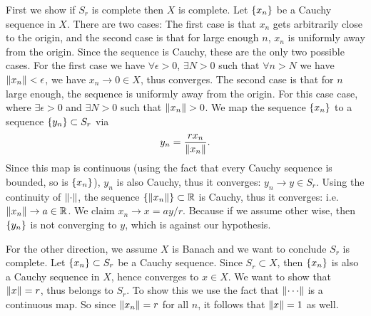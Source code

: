 \begin{solution}
	First we show if $ S_r $ is complete then $ X $ is complete. Let $ \{x_n\} $ be a Cauchy sequence in $ X $. There are two cases: The first case is that $ x_n $ gets arbitrarily close to the origin, and the second case is that for large enough $ n $, $ x_n $ is uniformly away from the origin. Since the sequence is Cauchy, these are the only two possible cases. For the first case we have $ \forall \epsilon>0 $, $ \exists N > 0 $ such that $ \forall n>N $ we have $ \norm{x_n}<\epsilon $, we have $ x_n\to 0 \in X $, thus converges. The second case is that for $ n $ large enough, the sequence is uniformly away from the origin. For this case case, where $ \exists\epsilon>0 $ and $ \exists N>0 $ such that $ \norm{x_n}>0 $. We map the sequence $ \{x_n\} $ to a sequence $ \{y_n\} \subset S_r $ via
	\[ y_n = \frac{rx_n}{\norm{x_n}}. \]
	Since this map is continuous (using the fact that every Cauchy sequence is bounded, so is $ \{x_n\} $), $ y_n $ is also Cauchy, thus it converges: $ y_n\to y\in S_r $. Using the continuity of $ \norm{\cdot} $, the sequence $ \{\norm{x_n}\}\subset\mathbb{R} $ is Cauchy, thus it converges: i.e. $ \norm{x_n} \to a\in \mathbb{R} $. We claim $ x_n \to x = ay/r $. Because if we assume other wise, then $ \{y_n\} $ is not converging to $ y $, which is against our hypothesis.
	
	For the other direction, we assume $ X $ is Banach and we want to conclude $ S_r $ is complete. Let $ \{x_n\} \subset S_r $ be a Cauchy sequence. Since $ S_r\subset X $, then $ \{x_n\} $ is also a Cauchy sequence in $ X $, hence converges to $ x \in X $. We want to show that $ \norm{x} = r $, thus belongs to $ S_r $. To show this we use the fact that $ \norm{\cdots} $ is a continuous map. So since $ \norm{x_n} = r $ for all $ n $, it follows that $ \norm{x} = 1 $ as well. 
\end{solution}


